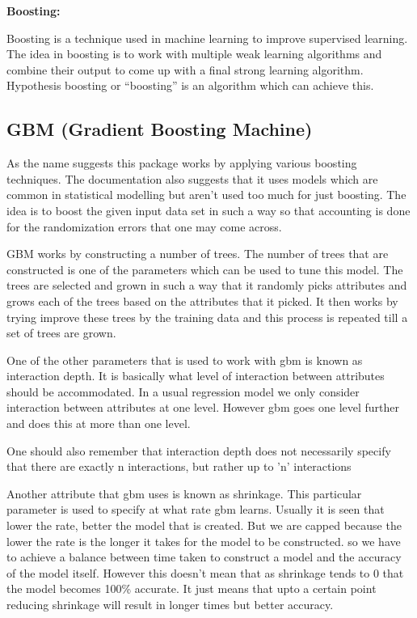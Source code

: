 \documentclass[paper=a4, fontsize=11pt]{scrartcl}	%
\numberwithin{equation}{section}		%
\numberwithin{figure}{section}			%
\numberwithin{table}{section}				%
\begin{document}
\begin{minipage}{\textwidth}

\textbf{Boosting:}

Boosting is a technique used in machine learning to improve supervised learning. The idea in boosting is to work with multiple weak learning algorithms and combine their output to come up with a final strong learning algorithm. Hypothesis boosting or ``boosting'' is an algorithm which can achieve this.
\end{minipage}

\subsection{GBM (Gradient Boosting Machine)}

As the name suggests this package works by applying various boosting techniques. The documentation also suggests that it uses models which are common in statistical modelling but aren't used too much for just boosting. The idea is to boost the given input data set in such a way so that accounting is done for the randomization errors that one may come across.

GBM works by constructing a number of trees. The number of trees that are constructed is one of the parameters which can be used to tune this model. The trees are selected and grown in such a way that it randomly picks attributes and grows each of the trees based on the attributes that it picked. It then works by trying improve these trees by the training data and this process is repeated till a set of trees are grown. 

One of the other parameters that is used to work with gbm is known as interaction depth. It is basically what level of interaction between attributes should be accommodated. In a usual regression model we only consider interaction between attributes at one level. However gbm goes one level further and does this at more than one level.

One should also remember that interaction depth does not necessarily specify that there are exactly n interactions, but rather up to 'n' interactions

Another attribute that gbm uses is known as shrinkage. This particular parameter is used to specify at what rate gbm learns. Usually it is seen that lower the rate, better the model that is created. But we are capped because the lower the rate is the longer it takes for the model to be constructed. so we have to achieve a balance between time taken to construct a model and the accuracy of the model itself. However this doesn't mean that as shrinkage tends to 0 that the model becomes 100\% accurate. It just means that upto a certain point reducing shrinkage will result in longer times but better accuracy.
\end{document}
